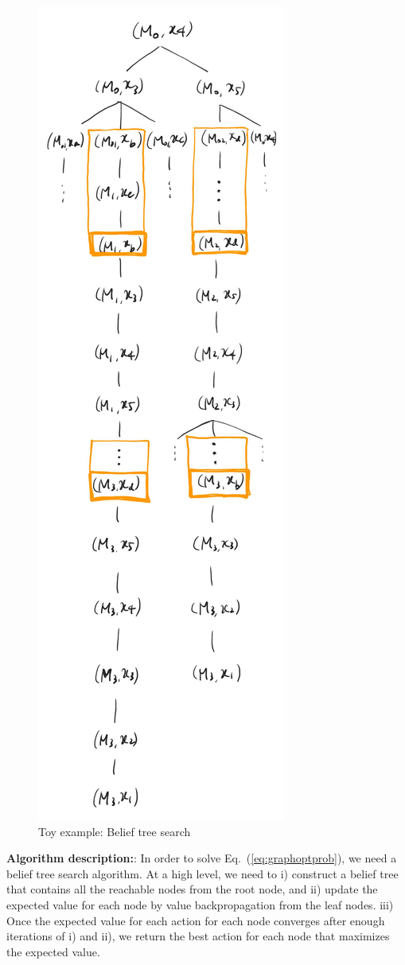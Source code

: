 \documentclass[letterpaper, 10 pt, conference]{ieeeconf}  %
\newcommand{\ph}[1]{{\textbf{#1}:}} %
\newcommand{\todo}[1]{{\color{red} #1 }} %
\begin{document}
\begin{figure}[ht!]
  \centering
  \includegraphics[width=.5\columnwidth]{figures/bts_example/bts_example.png}
  \caption{Toy example: Belief tree search}
  \label{fig:bts_example}
\end{figure}


\ph{Algorithm description:}
In order to solve Eq.~(\ref{eq:graphoptprob}), we need a belief tree search algorithm.
At a high level, we need to i) construct a belief tree that contains all the reachable nodes from the root node, and ii) update the expected value for each node by value backpropagation from the leaf nodes.
iii) Once the expected value for each action for each node converges after enough iterations of i) and ii), we return the best action for each node that maximizes the expected value.
\end{document}
